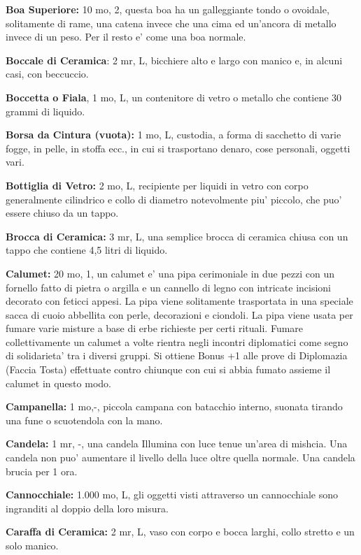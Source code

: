 \documentclass[a4paper,11pt,twoside,openany]{book}
\begin{document}
{		\textbf{Boa Superiore:} 10 mo, 2, questa boa ha un galleggiante tondo o ovoidale, solitamente di rame, una catena invece che una cima ed un'ancora di metallo invece di un peso. Per il resto e' come una boa normale.
		
		\textbf{Boccale di Ceramica}: 2 mr, L, bicchiere alto e largo con manico e, in alcuni casi, con beccuccio.
		
		\textbf{Boccetta o Fiala}, 1 mo, L, un contenitore di vetro o metallo che contiene 30 grammi di liquido.
		
		\textbf{Borsa da Cintura (vuota):} 1 mo, L, custodia, a forma di sacchetto di varie fogge, in pelle, in stoffa ecc., in cui si trasportano denaro, cose personali, oggetti vari.
		
		\textbf{Bottiglia di Vetro:} 2 mo, L, recipiente per liquidi in vetro con corpo generalmente cilindrico e collo di diametro notevolmente piu' piccolo, che puo' essere chiuso da un tappo.
		
		\textbf{Brocca di Ceramica:} 3 mr, L, una semplice brocca di ceramica chiusa con un tappo che contiene 4,5 litri di liquido.
		
		\textbf{Calumet:} 20 mo, 1, un calumet e' una pipa cerimoniale in due pezzi con un fornello fatto di pietra o argilla e un cannello di legno con intricate incisioni decorato con feticci appesi. La pipa viene solitamente trasportata in una speciale sacca di cuoio abbellita con perle, decorazioni e ciondoli. La pipa viene usata per fumare varie misture a base di erbe richieste per certi rituali. Fumare collettivamente un calumet a volte rientra negli incontri diplomatici come segno di solidarieta' tra i diversi gruppi. Si ottiene Bonus +1 alle prove di Diplomazia (Faccia Tosta) effettuate contro chiunque con cui si abbia fumato assieme il calumet in questo modo.
		
		\textbf{Campanella:} 1 mo,-, piccola campana con batacchio interno, suonata tirando una fune o scuotendola con la mano.
		
		\textbf{Candela:} 1 mr, -, una candela Illumina con luce tenue un'area di mishcia. Una candela non puo' aumentare il livello della luce oltre quella normale. Una candela brucia per 1 ora.
		
		\textbf{Cannocchiale:} 1.000 mo, L, gli oggetti visti attraverso un cannocchiale sono ingranditi al doppio della loro misura.
		
		\textbf{Caraffa di Ceramica:} 2 mr, L, vaso con corpo e bocca larghi, collo stretto e un solo manico.
		
}
\end{document}
